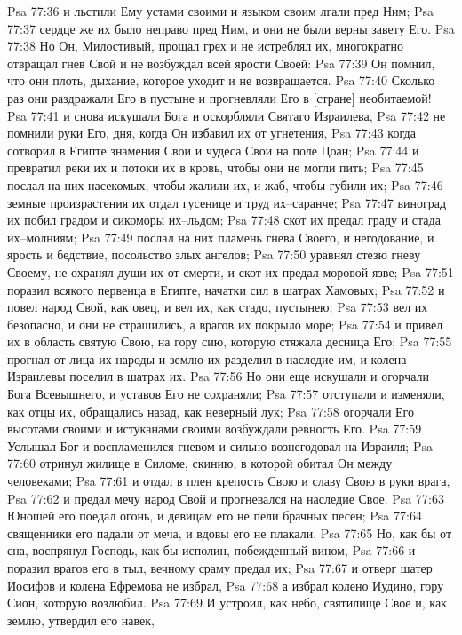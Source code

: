 Psa 77:36  и льстили Ему устами своими и языком своим лгали пред Ним;
Psa 77:37  сердце же их было неправо пред Ним, и они не были верны завету Его.
Psa 77:38  Но Он, Милостивый, прощал грех и не истреблял их, многократно отвращал гнев Свой и не возбуждал всей ярости Своей:
Psa 77:39  Он помнил, что они плоть, дыхание, которое уходит и не возвращается.
Psa 77:40  Сколько раз они раздражали Его в пустыне и прогневляли Его в [стране] необитаемой!
Psa 77:41  и снова искушали Бога и оскорбляли Святаго Израилева,
Psa 77:42  не помнили руки Его, дня, когда Он избавил их от угнетения,
Psa 77:43  когда сотворил в Египте знамения Свои и чудеса Свои на поле Цоан;
Psa 77:44  и превратил реки их и потоки их в кровь, чтобы они не могли пить;
Psa 77:45  послал на них насекомых, чтобы жалили их, и жаб, чтобы губили их;
Psa 77:46  земные произрастения их отдал гусенице и труд их--саранче;
Psa 77:47  виноград их побил градом и сикоморы их--льдом;
Psa 77:48  скот их предал граду и стада их--молниям;
Psa 77:49  послал на них пламень гнева Своего, и негодование, и ярость и бедствие, посольство злых ангелов;
Psa 77:50  уравнял стезю гневу Своему, не охранял души их от смерти, и скот их предал моровой язве;
Psa 77:51  поразил всякого первенца в Египте, начатки сил в шатрах Хамовых;
Psa 77:52  и повел народ Свой, как овец, и вел их, как стадо, пустынею;
Psa 77:53  вел их безопасно, и они не страшились, а врагов их покрыло море;
Psa 77:54  и привел их в область святую Свою, на гору сию, которую стяжала десница Его;
Psa 77:55  прогнал от лица их народы и землю их разделил в наследие им, и колена Израилевы поселил в шатрах их.
Psa 77:56  Но они еще искушали и огорчали Бога Всевышнего, и уставов Его не сохраняли;
Psa 77:57  отступали и изменяли, как отцы их, обращались назад, как неверный лук;
Psa 77:58  огорчали Его высотами своими и истуканами своими возбуждали ревность Его.
Psa 77:59  Услышал Бог и воспламенился гневом и сильно вознегодовал на Израиля;
Psa 77:60  отринул жилище в Силоме, скинию, в которой обитал Он между человеками;
Psa 77:61  и отдал в плен крепость Свою и славу Свою в руки врага,
Psa 77:62  и предал мечу народ Свой и прогневался на наследие Свое.
Psa 77:63  Юношей его поедал огонь, и девицам его не пели брачных песен;
Psa 77:64  священники его падали от меча, и вдовы его не плакали.
Psa 77:65  Но, как бы от сна, воспрянул Господь, как бы исполин, побежденный вином,
Psa 77:66  и поразил врагов его в тыл, вечному сраму предал их;
Psa 77:67  и отверг шатер Иосифов и колена Ефремова не избрал,
Psa 77:68  а избрал колено Иудино, гору Сион, которую возлюбил.
Psa 77:69  И устроил, как небо, святилище Свое и, как землю, утвердил его навек,
